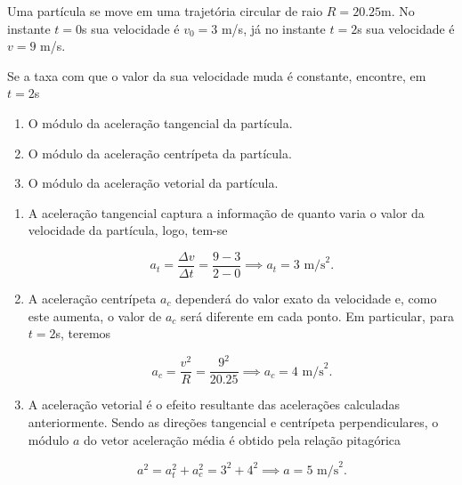 \begin{exemplo}[Nível I]\label{exemplo_cinematicavetorial_aceleracaotangencialex01}


Uma partícula se move em uma trajetória circular de raio $R=20.25$m. No instante $t=0$s sua velocidade é $v_0=3$ m/s, já no instante $t=2$s sua velocidade é $v=9$ m/s.

Se a taxa com que o valor da sua velocidade muda é constante, encontre, em $t=2$s

\begin{enumerate}
    \item [(a)] O módulo da aceleração tangencial da partícula.
    \item [(b)] O módulo da aceleração centrípeta da partícula.
    \item [(c)] O módulo da aceleração vetorial da partícula.
    
\end{enumerate}

\resolucao

\begin{enumerate}
   

 \item [(a)] A aceleração tangencial captura a informação de quanto varia o valor da velocidade da partícula, logo, tem-se

 $$ a_t = \dfrac{\Delta v}{\Delta t}=\dfrac{9-3}{2-0} \implies \boxed{a_t=3 \text{ m/s}^2.}$$

 \item [(b)] A aceleração centrípeta $a_c$ dependerá do valor exato da velocidade e, como este aumenta, o valor de $a_c$ será diferente em cada ponto. Em particular, para $t=2$s, teremos

  $$ a_c = \dfrac{v^2}{R} = \dfrac{9^2}{20.25} \implies \boxed{a_c= 4 \text{ m/s}^2.}$$

\item [(c)] A aceleração vetorial é o efeito resultante das acelerações calculadas anteriormente. Sendo as direções tangencial e centrípeta perpendiculares, o módulo $a$ do vetor aceleração média é obtido pela relação pitagórica

$$ a^2 = a_t^2+a_c^2 = 3^2+4^2 \implies \boxed{a= 5 \text{ m/s}^2.}$$
  \end{enumerate}
    
\end{exemplo}







